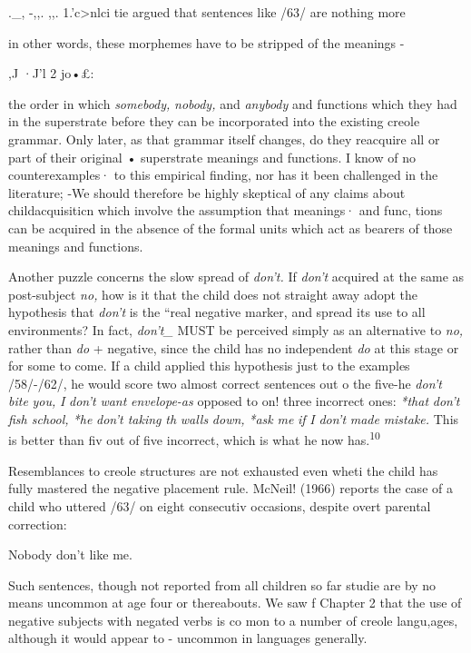 .\_, {}-,,. ,,. 1.'c{\textgreater}nlci tie argued that sentences like /63/ are nothing more

in other words, these morphemes have to be stripped of the meanings -

,J ·J'l 2 jo•£:

the order in which \textit{somebody,} \textit{nobody,} and \textit{anybody}
and functions which they had in the superstrate before they can be
incorporated into the existing creole grammar. Only later, as that grammar itself changes, do they reacquire all or part of their original • superstrate meanings and functions. I know of no counterexamples· to this empirical finding, nor has it been challenged in the literature; {}-\-We should therefore be highly skeptical of any claims about child\-acquisiticn which involve the assumption that meanings· and func, tions can be acquired in the absence of the formal units which act as bearers of those meanings and functions.

Another puzzle concerns the slow spread of \textit{don't.} If \textit{don't} acquired at the same  as post-subject \textit{no,} how is it that the child does not straight away adopt the hypothesis that \textit{don't }is the ``real negative marker, and spread its use to all environments? In fact, \textit{don't\_} MUST be perceived simply as an alternative to \textit{no,} rather than \textit{do} + negative, since the child has no independent \textit{do} at this stage or for some  to come. If a child applied this hypothesis just to the exam\-ples /58/-/62/, he would score two almost correct sentences out o the five-he \textit{don't} \textit{bite} \textit{you,} \textit{I} \textit{don't} \textit{want} \textit{envelope-as} opposed to on! three incorrect ones: \textit{*that} \textit{don't} \textit{fish school, *he} \textit{don't taki}\textit{n}\textit{g} \textit{th} \textit{walls} \textit{down,} \textit{*ask} \textit{me} \textit{if} \textit{I} \textit{don't} \textit{made} \textit{mistake.} This is better than fiv out of five incorrect, which is what he now has.\textsuperscript{10}

Resemblances to creole structures are not exhausted even wheti the child has fully mastered the negative placement rule. McNeil! (1966) reports the case of a child who uttered /63/ on eight consecutiv occasions, despite overt parental correction:

\ea\label{ex:63}
 Nobody don't like me.
\glt
\z

Such sentences, though not reported from all children so far studie are by no means uncommon at age four or thereabouts. We saw f Chapter 2 that the use of negative subjects with negated verbs is co mon to a number of creole langu,ages, although it would appear to {}- uncommon in languages generally.

